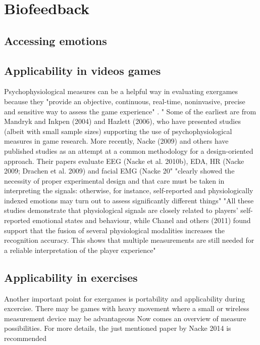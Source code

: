 \section{Biofeedback}


\subsection{Accessing emotions}


\subsection{Applicability in videos games}
Psychophysiological measures can be a helpful way in evaluating exergames because they "provide an objective, continuous, real-time, noninvasive, precise and sensitive way to assess the game experience" \cite{kivikangas2011review}. 
" Some of the earliest are from Mandryk and Inkpen (2004) and Hazlett (2006), who have presented studies (albeit with small sample sizes) supporting the use of psychophysiological measures in game research. More recently, Nacke (2009) and others have published studies as an attempt at a common methodology for a design-oriented approach. Their papers evaluate EEG (Nacke et al. 2010b), EDA, HR (Nacke 2009; Drachen et al. 2009) and facial EMG (Nacke 20" \cite{kivikangas2011review} "clearly showed the necessity of proper experimental design and that care must be taken in interpreting the signals: otherwise, for instance, self-reported and physiologically indexed emotions may turn out to assess significantly different things"  \cite{kivikangas2011review}
"All these studies demonstrate that physiological signals are closely related to players’ self-reported emotional states and behaviour, while Chanel and others (2011) found support that the fusion of several physiological modalities increases the recognition accuracy. This shows that multiple measurements are still needed for a reliable interpretation of the player experience"  \cite{kivikangas2011review}

\subsection{Applicability in exercises}
Another important point for exergames is portability and applicability during excercise. There may be games with heavy movement where a small or wireless measurement device may be advantageous 
Now comes an overview of measure possibilities. For more details, the just mentioned paper by Nacke 2014 is recommended 




